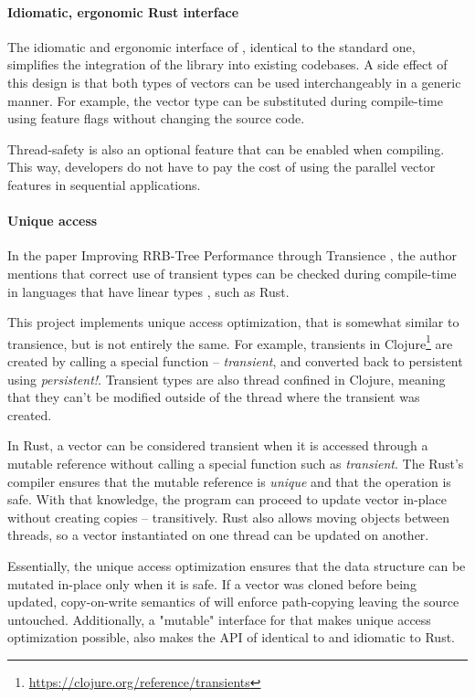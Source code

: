 \paragraph{Idiomatic, ergonomic Rust interface}
The idiomatic and ergonomic interface of \pvecrs{}, identical to the standard one, simplifies the integration of the library into existing codebases. A side effect of this design is that both types of vectors can be used interchangeably in a generic manner. For example, the vector type can be substituted during compile-time using feature flags without changing the source code. 

Thread-safety is also an optional feature that can be enabled when compiling. This way, developers do not have to pay the cost of using the parallel vector features in sequential applications. 

\paragraph{Unique access}
In the paper Improving RRB-Tree Performance through Transience \cite{improving-performance-through-transience}, the author mentions that correct use of transient types can be checked during compile-time in languages that have linear types \cite{linear-types-can-change-the-world}, such as Rust. 

This project implements unique access optimization, that is somewhat similar to transience, but is not entirely the same. For example, transients in Clojure\footnote{\url{https://clojure.org/reference/transients}} are created by calling a special function -- \emph{transient}, and converted back to persistent using \emph{persistent!}. Transient types are also thread confined in Clojure, meaning that they can't be modified outside of the thread where the transient was created. 

In Rust, a vector can be considered transient when it is accessed through a mutable reference without calling a special function such as \emph{transient}. The Rust's compiler ensures that the mutable reference is \emph{unique} and that the operation is safe. With that knowledge, the program can proceed to update vector in-place without creating copies -- transitively. Rust also allows moving objects between threads, so a vector instantiated on one thread can be updated on another. 

Essentially, the unique access optimization ensures that the data structure can be mutated in-place only when it is safe. If a vector was cloned before being updated, copy-on-write semantics of \rc{} will enforce path-copying leaving the source untouched. Additionally, a "mutable" interface for \pvec{} that makes unique access optimization possible, also makes the API of \pvec{} identical to \stdvec{} and idiomatic to Rust.

